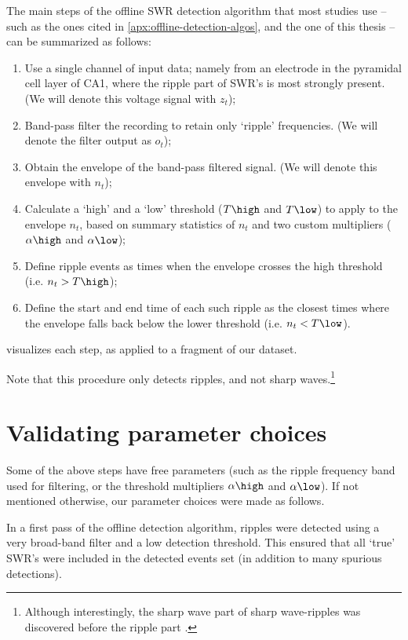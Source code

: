 The main steps of the offline SWR detection algorithm that most studies use -- such as the ones cited in \cref{apx:offline-detection-algos}, and the one of this thesis -- can be summarized as follows:
\begin{enumerate}
\item Use a single channel of input data; namely from an electrode in the pyramidal cell layer of CA1, where the ripple part of SWR's is most strongly present. (We will denote this voltage signal with $z_t$);
\item Band-pass filter the recording to retain only `ripple' frequencies. (We will denote the filter output as $o_t$);
\item Obtain the envelope of the band-pass filtered signal. (We will denote this envelope with $n_t$);
\item Calculate a `high' and a `low' threshold ($T\high$ and $T\low$) to apply to the envelope $n_t$, based on summary statistics of $n_t$ and two custom multipliers ($\alpha\high$ and $\alpha\low$);
\item Define ripple events as times when the envelope crosses the high threshold (i.e. $n_t > T\high$);
\item Define the start and end time of each such ripple as the closest times where the envelope falls back below the lower threshold (i.e. $n_t < T\low$).
\end{enumerate}

 visualizes each step, as applied to a fragment of our dataset.

Note that this procedure only detects ripples, and not sharp waves.\footnote{Although interestingly, the sharp wave part of sharp wave-ripples was discovered before the ripple part \cite[p. 1]{Buzsaki2015}.}




\section{Validating parameter choices}
\label{sec:validating-parameter-choices}

Some of the above steps have free parameters (such as the ripple frequency band used for filtering, or the threshold multipliers $\alpha\high$ and $\alpha\low$). If not mentioned otherwise, our parameter choices were made as follows.

In a first pass of the offline detection algorithm, ripples were detected using a very broad-band filter and a low detection threshold. This ensured that all `true' SWR's were included in the detected events set (in addition to many spurious detections).

